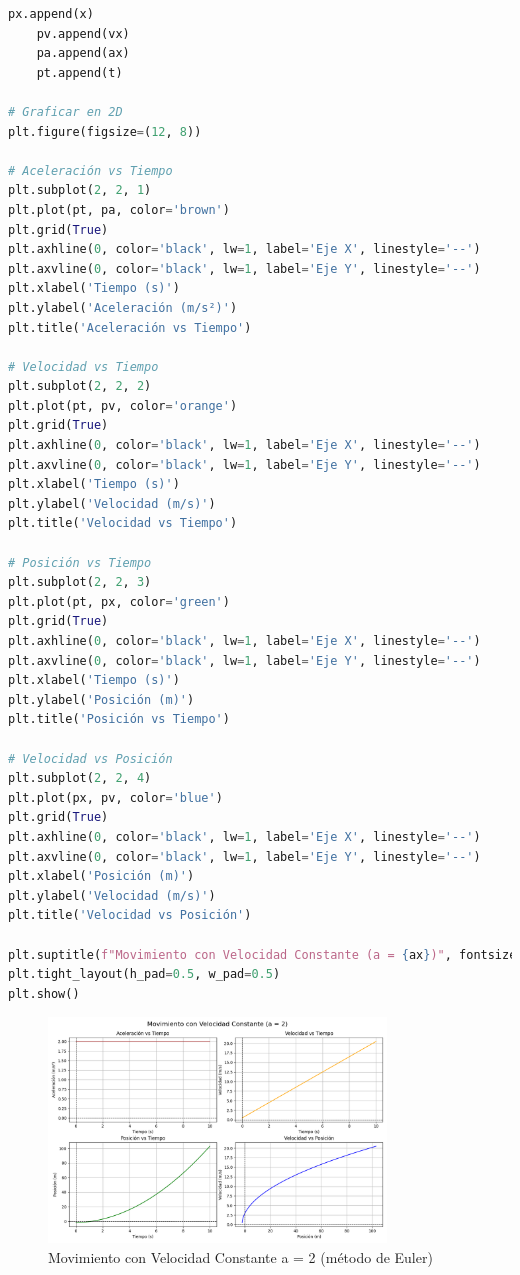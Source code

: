 \documentclass{article}
\begin{document}
\begin{center}
\begin{lstlisting}[language=Python, caption={Implementación detallada del método de Euler}]
    px.append(x)
    pv.append(vx)
    pa.append(ax)
    pt.append(t)

# Graficar en 2D
plt.figure(figsize=(12, 8))

# Aceleración vs Tiempo
plt.subplot(2, 2, 1)
plt.plot(pt, pa, color='brown')
plt.grid(True)
plt.axhline(0, color='black', lw=1, label='Eje X', linestyle='--')
plt.axvline(0, color='black', lw=1, label='Eje Y', linestyle='--')
plt.xlabel('Tiempo (s)')
plt.ylabel('Aceleración (m/s²)')
plt.title('Aceleración vs Tiempo')

# Velocidad vs Tiempo
plt.subplot(2, 2, 2)
plt.plot(pt, pv, color='orange')
plt.grid(True)
plt.axhline(0, color='black', lw=1, label='Eje X', linestyle='--')
plt.axvline(0, color='black', lw=1, label='Eje Y', linestyle='--')
plt.xlabel('Tiempo (s)')
plt.ylabel('Velocidad (m/s)')
plt.title('Velocidad vs Tiempo')

# Posición vs Tiempo
plt.subplot(2, 2, 3)
plt.plot(pt, px, color='green')
plt.grid(True)
plt.axhline(0, color='black', lw=1, label='Eje X', linestyle='--')
plt.axvline(0, color='black', lw=1, label='Eje Y', linestyle='--')
plt.xlabel('Tiempo (s)')
plt.ylabel('Posición (m)')
plt.title('Posición vs Tiempo')

# Velocidad vs Posición
plt.subplot(2, 2, 4)
plt.plot(px, pv, color='blue')
plt.grid(True)
plt.axhline(0, color='black', lw=1, label='Eje X', linestyle='--')
plt.axvline(0, color='black', lw=1, label='Eje Y', linestyle='--')
plt.xlabel('Posición (m)')
plt.ylabel('Velocidad (m/s)')
plt.title('Velocidad vs Posición')

plt.suptitle(f"Movimiento con Velocidad Constante (a = {ax})", fontsize=16)
plt.tight_layout(h_pad=0.5, w_pad=0.5)
plt.show()

	\end{lstlisting}

    \begin{figure}[H]
    \centering
    \includegraphics[width=0.8\textwidth]{img/1-2.png}
    \caption{Movimiento con Velocidad Constante a = 2 (método de Euler)}
    \label{fig:salida_consola}
\end{figure}


\end{center}
\end{document}
